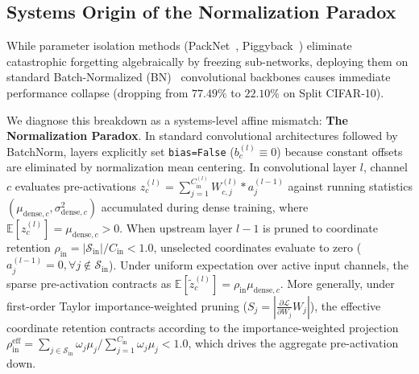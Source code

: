 \documentclass{article}
\begin{document}
\subsection{Systems Origin of the Normalization Paradox}
While parameter isolation methods (PackNet~\cite{mallya2018packnet}, Piggyback~\cite{mallya2018piggyback}) eliminate catastrophic forgetting algebraically by freezing sub-networks, deploying them on standard Batch-Normalized (BN)~\cite{ioffe2015batch} convolutional backbones causes immediate performance collapse (dropping from $77.49\%$ to $22.10\%$ on Split CIFAR-10). 

We diagnose this breakdown as a systems-level affine mismatch: \textbf{The Normalization Paradox}. In standard convolutional architectures followed by BatchNorm, layers explicitly set \texttt{bias=False} ($b_c^{(l)} \equiv 0$) because constant offsets are eliminated by normalization mean centering. In convolutional layer $l$, channel $c$ evaluates pre-activations $z_c^{(l)} = \sum_{j=1}^{C_{\mathrm{in}}^{(l)}} W_{c, j}^{(l)} * a_j^{(l-1)}$ against running statistics $(\mu_{\mathrm{dense}, c}, \sigma_{\mathrm{dense}, c}^2)$ accumulated during dense training, where $\mathbb{E}[z_c^{(l)}] = \mu_{\mathrm{dense}, c} > 0$. When upstream layer $l-1$ is pruned to coordinate retention $\rho_{\mathrm{in}} = |\mathcal{S}_{\mathrm{in}}| / C_{\mathrm{in}} < 1.0$, unselected coordinates evaluate to zero ($a_j^{(l-1)} = 0, \forall j \notin \mathcal{S}_{\mathrm{in}}$). Under uniform expectation over active input channels, the sparse pre-activation contracts as $\mathbb{E}[\tilde{z}_c^{(l)}] = \rho_{\mathrm{in}} \mu_{\mathrm{dense}, c}$. More generally, under first-order Taylor importance-weighted pruning ($S_j = |\frac{\partial \mathcal{L}}{\partial W_j} W_j|$), the effective coordinate retention contracts according to the importance-weighted projection $\rho_{\mathrm{in}}^{\mathrm{eff}} = \sum_{j \in \mathcal{S}_{\mathrm{in}}} \omega_j \mu_j / \sum_{j=1}^{C_{\mathrm{in}}} \omega_j \mu_j < 1.0$, which drives the aggregate pre-activation down.
\end{document}

